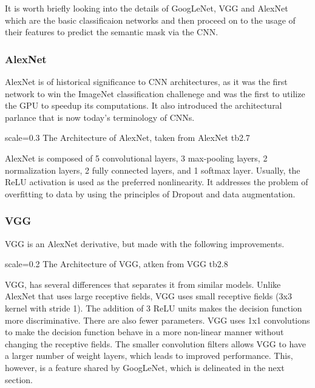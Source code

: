 It is worth briefly looking into the details of GoogLeNet, VGG and AlexNet which are the basic classificaion networks and then proceed on to the usage of their features to predict the semantic mask via the CNN. 

\subsubsection{AlexNet}
AlexNet is of historical significance to CNN architectures, as it was the first network to win the ImageNet classification challenege and was the first to utilize the GPU to speedup its computations. It also introduced the architectural parlance that is now today's terminology of CNNs. 

{scale=0.3}%
{The Architecture of AlexNet, taken from \cite{Krizhevsky2012}}%
{AlexNet}%
{tb2.7} %

AlexNet is composed of 5 convolutional layers, 3 max-pooling layers, 2 normalization layers, 2 fully connected layers, and 1 softmax layer. Usually, the ReLU activation is used as the preferred nonlinearity. It addresses the problem of overfitting to data by using the principles of Dropout and data augmentation. 

\subsubsection{VGG}

VGG is an AlexNet derivative, but made with the following improvements.

{scale=0.2}%
{The Architecture of VGG, atken from \cite{Simonyan2015}}%
{VGG}%
{tb2.8} %

VGG, has several differences that separates it from similar models. 
Unlike AlexNet that uses large receptive fields, VGG uses small receptive fields (3x3 kernel with stride 1). The addition of 3 ReLU units makes the decision function more discriminative. There are also fewer parameters. VGG uses 1x1 convolutions to make the decision function behave in a more non-linear manner without changing the receptive fields.
The smaller convolution filters allows VGG to have a larger number of weight layers, which leads to improved performance. This, however, is a feature shared by GoogLeNet, which is delineated in the next section. 

